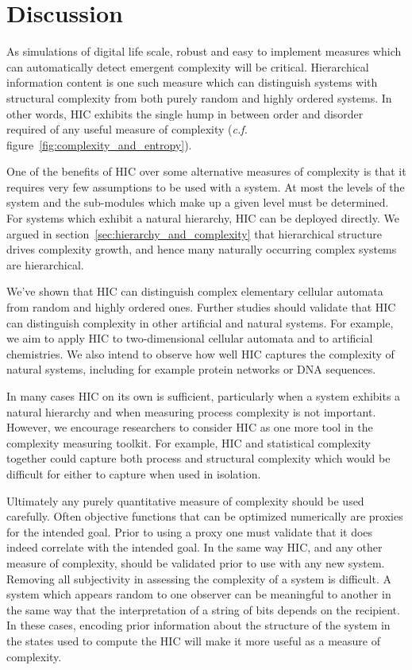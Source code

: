 \section{Discussion}

As simulations of digital life scale, robust and easy to implement measures
which can automatically detect emergent complexity will be critical.
Hierarchical information content is one such measure which can distinguish
systems with structural complexity from both purely random and highly ordered
systems. In other words, HIC exhibits the single hump in between order and
disorder required of any useful measure of complexity (\emph{c.f.}
figure~\ref{fig:complexity_and_entropy}).

One of the benefits of HIC over some alternative measures of complexity is that
it requires very few assumptions to be used with a system. At most the levels
of the system and the sub-modules which make up a given level must be
determined. For systems which exhibit a natural hierarchy, HIC can be deployed
directly. We argued in section~\ref{sec:hierarchy_and_complexity} that
hierarchical structure drives complexity growth, and hence many naturally
occurring complex systems are hierarchical.

We've shown that HIC can distinguish complex elementary cellular automata from
random and highly ordered ones. Further studies should validate that HIC can
distinguish complexity in other artificial and natural systems. For example, we
aim to apply HIC to two-dimensional cellular automata and to artificial
chemistries. We also intend to observe how well HIC captures the complexity of
natural systems, including for example protein networks or DNA sequences.

In many cases HIC on its own is sufficient, particularly when a system exhibits
a natural hierarchy and when measuring process complexity is not important.
However, we encourage researchers to consider HIC as one more tool in the
complexity measuring toolkit. For example, HIC and statistical complexity
together could capture both process and structural complexity which would be
difficult for either to capture when used in isolation.

Ultimately any purely quantitative measure of complexity should be used
carefully. Often objective functions that can be optimized numerically are
proxies for the intended goal. Prior to using a proxy one must validate that it
does indeed correlate with the intended goal. In the same way HIC, and any
other measure of complexity, should be validated prior to use with any new
system. Removing all subjectivity in assessing the complexity of a system is
difficult. A system which appears random to one observer can be meaningful
to another in the same way that the interpretation of a string of bits
depends on the recipient. In these cases, encoding prior information about the
structure of the system in the states used to compute the HIC will make it more
useful as a measure of complexity.

